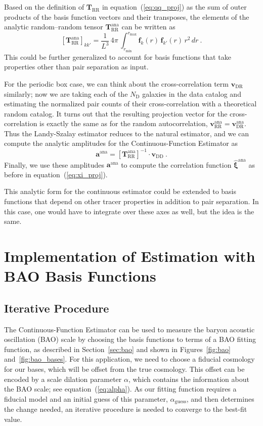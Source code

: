 \documentclass[modern]{aastex62}
\newcommand{\Est}{The Continuous-Function Estimator\xspace}
\newcommand{\est}{the Continuous-Function Estimator\xspace}
\newcommand{\eqt}[1]{equation~(\ref{#1})}
\newcommand{\inv}{^{-1}}
\newcommand{\bld}[1]{\bm{#1}} %
\newcommand{\vv}[1]{\bld{v}_\mathrm{#1}}
\newcommand{\TT}[1]{\bld{T}_\mathrm{#1}}
\newcommand{\ff}{\bld{f}}
\newcommand{\NN}[1]{N_\mathrm{#1}}
\begin{document}
Based on the definition of $\TT{RR}$ in \eqt{eq:qq_proj} as the sum of outer products of the basis function vectors and their transposes, the elements of the analytic random--random tensor $\TT{RR}^\mathrm{ana}$ can be written as
\begin{equation}
\left[ \TT{RR}^\mathrm{ana} \right]_{kk'} = \frac{1}{L^3} \, 4\pi \, \int_{r_\mathrm{min}}^{r_\mathrm{max}} \ff_k(r) \, \ff_{k'}(r) \, r^2 \, dr ~.
\end{equation}
This could be further generalized to account for basis functions that take properties other than pair separation as input.

For the periodic box case, we can think about the cross-correlation term $\vv{DR}$ similarly; now we are taking each of the $\NN{D}$ galaxies in the data catalog and estimating the normalized pair counts of their cross-correlation with a theoretical random catalog.
It turns out that the resulting projection vector for the cross-correlation is exactly the same as for the random autocorrelation, $\vv{RR}^\mathrm{ana}  = \vv{DR}^\mathrm{ana}$.
Thus the Landy-Szalay estimator reduces to the natural estimator, and we can compute the analytic amplitudes for \est as
\begin{equation}
\bld{a}^{\mathrm{ana}} = \left[ \TT{RR}^\mathrm{ana} \right]\inv \cdot \vv{DD} ~.
\end{equation}
Finally, we use these amplitudes $\bld{a}^{\mathrm{ana}}$ to compute the correlation function $\bld{\hat{\xi}}^{\mathrm{ana}}$ as before in \eqt{eq:xi_proj}.

This analytic form for the continuous estimator could be extended to basis functions that depend on other tracer properties in addition to pair separation.
In this case, one would have to integrate over these axes as well, but the idea is the same.


\section{Implementation of Estimation with BAO Basis Functions}\label{sec:baoiter}

\subsection{Iterative Procedure}

\Est can be used to measure the baryon acoustic oscillation (BAO) scale by choosing the basis functions to terms of a BAO fitting function, as described in Section~\ref{sec:bao} and shown in Figures~\ref{fig:bao} and~\ref{fig:bao_bases}.
For this application, we need to choose a fiducial cosmology for our bases, which will be offset from the true cosmology.
This offset can be encoded by a scale dilation parameter $\alpha$, which contains the information about the BAO scale; see \eqt{eq:alpha}. 
As our fitting function requires a fiducial model and an initial guess of this parameter, $\alpha_\mathrm{guess}$, and then determines the change needed, an iterative procedure is needed to converge to the best-fit value.
\end{document}
